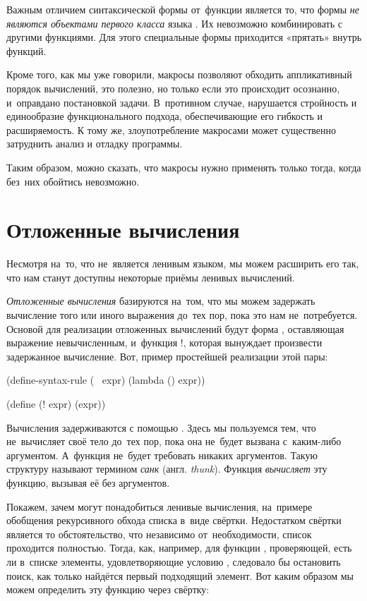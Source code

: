Важным отличием синтаксической формы от~функции является то, что формы \emph{не являются объектами первого класса} языка \Scheme. Их невозможно комбинировать с  другими функциями. Для этого специальные формы приходится «прятать» внутрь функций.

Кроме того, как мы уже говорили, макросы позволяют обходить аппликативный порядок вычислений, это полезно, но только если это происходит осознанно, и~оправдано постановкой задачи. В~противном случае, нарушается стройность и единообразие функционального подхода, обеспечивающие его гибкость и расширяемость. К тому же, злоупотребление макросами может существенно затруднить анализ и отладку программы.

Таким образом, можно сказать, что макросы нужно применять только тогда, когда без~них обойтись невозможно.

\section{Отложенные вычисления}%
\label{delay}Несмотря на~то, что \Scheme не~является ленивым языком, мы можем расширить его так, что нам станут доступны некоторые приёмы ленивых вычислений.

\emph{Отложенные вычисления} базируются на~том, что мы можем задержать вычисление того или иного выражения до~тех пор, пока это нам не~потребуется. Основой для реализации отложенных вычислений будут форма , оставляющая выражение  невычисленным, и~функция \si{!}, которая вынуждает произвести задержанное вычисление.
\label{lazy}Вот, пример простейшей реализации этой пары:

\begin{Definition}
(define-syntax-rule (~ expr)
  (lambda () expr))

(define (! expr) (expr))
\end{Definition}

Вычисления задерживаются с помощью . Здесь мы пользуемся тем, что  не~вычисляет своё тело до~тех пор, пока она не~будет вызвана с~каким-либо аргументом. А~функция  не~будет требовать никаких аргументов. Такую структуру называют термином \emph{санк} (англ. \emph{thunk}). Функция \s{!} \emph{вычисляет} эту функцию, вызывая её без аргументов.

Покажем, зачем могут понадобиться ленивые вычисления, на~примере обобщения рекурсивного обхода списка в~виде свёртки. Недостатком свёртки является то обстоятельство, что независимо от~необходимости, список проходится полностью. Тогда, как, например, для функции , проверяющей, есть ли в~списке  элементы, удовлетворяющие условию , следовало бы остановить поиск, как только найдётся первый подходящий элемент. Вот каким образом мы можем определить эту функцию через свёртку:

